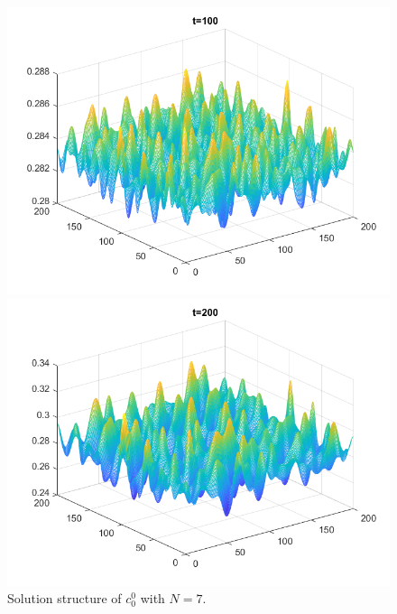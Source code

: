 \begin{frame}
\begin{figure}[H]
		\vspace{2ex}
		
		\begin{minipage}{0.4\textwidth}
			\centering
			\includegraphics[scale=0.25]{Bilder_wxwy/14th_t=100_mx=my=200_random_Dr=1_(1.d0+(1.d-2rand(0)-5.d-4))Divide(2.d0dsqrt(pi))}
		\end{minipage}
		\hfill 
		\begin{minipage}{0.4\textwidth}
			\centering
			\includegraphics[scale=0.25]{Bilder_wxwy/14th_t=200_mx=my=200_random_Dr=1_(1.d0+(1.d-2rand(0)-5.d-4))Divide(2.d0dsqrt(pi))}
		\end{minipage}
		
		\caption{Solution structure of \(c^0_0\) with \(N = 7\).}
	\end{figure}
\end{frame}


